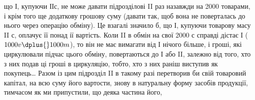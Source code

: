 що І, купуючи ІІс, не може давати підрозділові II раз назавжди на
2000 товарами, і крім того ще додаткову грошову суму (давати так,
щоб вона не поверталась до нього через операцію обміну). Це взагалі
значило б, що І, купуючи товарову масу II с, оплачує її понад ії вартість.
Коли II в обмін на свої 2000 с справді дістає І ($1000 v \dplus{} 1000 m$),
то він не має вимагати від І нічого більше, і гроші, які циркулювали
підчас цього обміну, повертаються до І або II, залежно від того, хто з
них подав ці гроші в циркуляцію, тобто, хто з них раніш виступив як
покупець\dots{} Разом із цим підрозділ II в такому разі перетворив би свій
товаровий капітал, на всю суму його вартости, знову в натуральну форму
засобів продукції, тимчасом як ми припустили, що деяка частина його,
\parbreak{}  %
